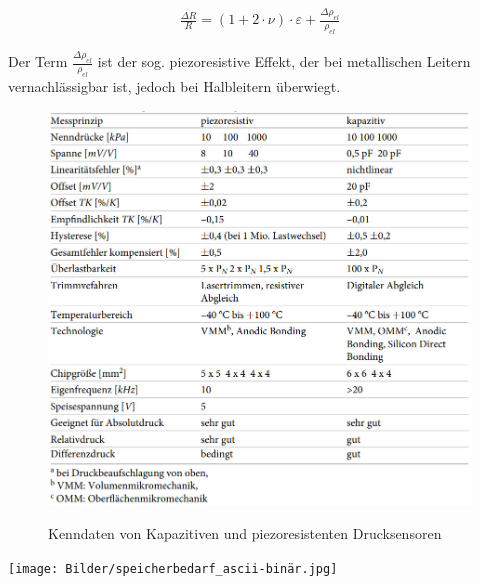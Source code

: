\begin{align}
\label{eq:wiederstand_substi}
\frac{\Delta R}{R} =(1+2 \cdot \nu) \cdot \varepsilon + \frac{\Delta \rho_{el}}{\rho_{el}}
\end{align}

Der Term $\frac{\Delta \rho_{el}}{\rho_{el}}$ ist der sog. \glqq piezoresistive Effekt\grqq , der bei metallischen Leitern vernachlässigbar ist, jedoch bei Halbleitern überwiegt. 



\begin{figure}[h!]
\centering
\caption{Kenndaten von Kapazitiven und piezoresistenten Drucksensoren \cite[S. 472 ff.]{Tränkler2015}}
\includegraphics[width=1\textwidth]{Bilder/piezo_kapa.jpg}
\label{tab:piezo_kapa} 
\end{figure}


\begin{minipage}[][][t]{1\textwidth}
\centering
\texttt{[image: Bilder/speicherbedarf\_ascii-binär.jpg]}
\label{fig:speicherbedarf_vergleich}
\end{minipage}

